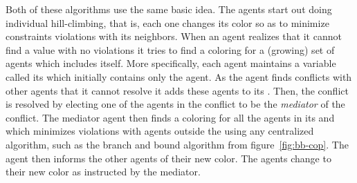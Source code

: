 Both of these algorithms use the same basic idea. The agents start out
doing individual hill-climbing, that is, each one changes its color so
as to minimize constraints violations with its neighbors.  When an
agent realizes that it cannot find a value with no violations it tries
to find a coloring for a (growing) set of agents which includes
itself.  More specifically, each agent maintains a variable called its
 which initially contains only the agent. As the agent
finds conflicts with other agents that it cannot resolve it adds these
agents to its . Then, the conflict is resolved by
electing one of the agents in the conflict to be the \emph{mediator}
of the conflict. The mediator agent then finds a coloring for all the
agents in its  and which minimizes violations with
agents outside the  using any centralized algorithm,
such as the branch and bound algorithm from figure~\ref{fig:bb-cop}.
The agent then informs the other agents of their new color. The agents
change to their new color as instructed by the mediator.



